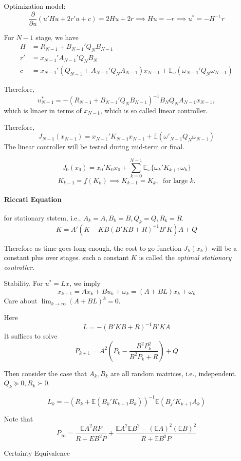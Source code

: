 Optimization model:
\[
\frac{\partial}{\partial u}(u'Hu+2r'u+c) = 2Hu+2r\implies
Hu = -r\implies
u^*=-H^{-1}r
\]

For $N-1$ stage, we have
\begin{align*}
H&=R_{N-1}+B_{N-1}'Q_NB_{N-1}\\
r'&=x_{N-1}'A_{N-1}'Q_NB_N\\
c&=x_{N-1}'(Q_{N-1}+A_{N-1}'Q_NA_{N-1})x_{N-1}
+
\mathbb{E}_{\omega}(\omega_{N-1}'Q_N\omega_{N-1})
\end{align*}

Therefore,
\[
u_{N-1}^*=-(R_{N-1}+B_{N-1}'Q_NB_{N-1})^{-1}B_NQ_NA_{N-1}x_{N-1},
\]
which is linaer in terms of $x_{N-1}$, which is so called linear controller.

Therefore,
\[
J_{N-1}(x_{N-1})
=
x_{N-1}'K_{N-1}x_{N-1}
+
\mathbb{E}(\omega'_{N-1}Q_N\omega_{N-1})
\]
The linear controller will be tested during mid-term or final.

\[
J_0(x_0)=x_0'K_0x_0+\sum_{k=0}^{N-1}\mathbb{E}_\omega\{\omega_k'K_{k+1}\omega_k\}
\]
\[
K_{k-1}=f(K_k)\implies K_{k-1}=K_k,\ \text{ for large }k.
\]

\paragraph{Riccati Equation}

for stationary ststem, i.e., $A_k=A,B_k=B,Q_k=Q,R_k=R$.
\[
K=A'(K - KB(B'KB+R)^{-1}B'K)A+Q
\]

Therefore as time goes long enough, the cost to go function $J_k(x_k)$ will be a constant plus over stages. such a constant $K$ is called the \emph{optimal stationary controller}.

Stability. For $u^*=Lx$, we imply
\[
x_{k+1}=Ax_k+Bu_k+\omega_k=(A+BL)x_k+\omega_k
\]
Care about $\lim_{k\to\infty}(A+BL)^k=0$.

Here
\[
L = -(B'KB+R)^{-1}B'KA
\]
It suffices to solve
\[
P_{k+1} = A^2\left(
P_k-\frac{B^2P_k^2}{B^2P_k+R}
\right)
+
Q
\]

Then consider the case that $A_k,B_k$ are all random matrices, i.e., independent. $Q_k\succeq0, R_k\succ0$.

\[
L_k = -\left(
R_k+\mathbb{E}(B_k'K_{k+1}B_k)
\right)^{-1}
\mathbb{E}(B_j'K_{k+1}A_k)
\]

Note that
\[
P_{\infty}
=
\frac{\mathbb{E}A^2 RP}{R+EB^2P}
+
\frac{\mathbb{E}A^2\mathbb{E}B^2 - (\mathbb{E}A)^2 (\mathbb{E}B)^2}{R + \mathbb{E}B^2P}
\]

Certainty Equivalence

